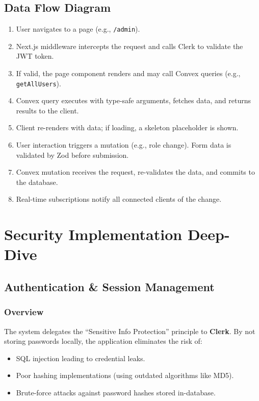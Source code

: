 \documentclass[11pt,a4paper]{article}
\begin{document}
\subsection{Data Flow Diagram}
\begin{enumerate}
    \item User navigates to a page (e.g., \texttt{/admin}).
    \item Next.js middleware intercepts the request and calls Clerk to validate the JWT token.
    \item If valid, the page component renders and may call Convex queries (e.g., \texttt{getAllUsers}).
    \item Convex query executes with type-safe arguments, fetches data, and returns results to the client.
    \item Client re-renders with data; if loading, a skeleton placeholder is shown.
    \item User interaction triggers a mutation (e.g., role change). Form data is validated by Zod before submission.
    \item Convex mutation receives the request, re-validates the data, and commits to the database.
    \item Real-time subscriptions notify all connected clients of the change.
\end{enumerate}

\section{Security Implementation Deep-Dive}

\subsection{Authentication \& Session Management}

\subsubsection{Overview}
The system delegates the ``Sensitive Info Protection'' principle to \textbf{Clerk}. By not storing passwords locally, the application eliminates the risk of:
\begin{itemize}
    \item SQL injection leading to credential leaks.
    \item Poor hashing implementations (using outdated algorithms like MD5).
    \item Brute-force attacks against password hashes stored in-database.
\end{itemize}
\end{document}
